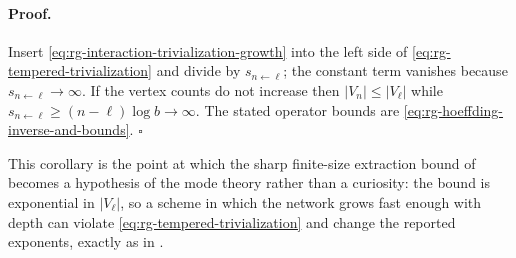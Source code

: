 \paragraph{Proof.}
Insert \eqref{eq:rg-interaction-trivialization-growth} into the left side of
\eqref{eq:rg-tempered-trivialization} and divide by \(s_{n\leftarrow\ell}\); the
constant term vanishes because \(s_{n\leftarrow\ell}\to\infty\).  If the vertex
counts do not increase then \(\lvert V_n\rvert\leq\lvert V_\ell\rvert\) while
\(s_{n\leftarrow\ell}\geq(n-\ell)\log b\to\infty\).  The stated operator bounds
are \eqref{eq:rg-hoeffding-inverse-and-bounds}. \(\square\)

This corollary is the point at which the sharp finite-size extraction bound of
 becomes a hypothesis of the mode
theory rather than a curiosity: the bound is exponential in
\(\lvert V_\ell\rvert\), so a scheme in which the network grows fast enough with
depth can violate \eqref{eq:rg-tempered-trivialization} and change the reported
exponents, exactly as in
. 

